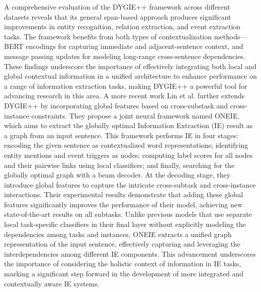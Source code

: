 A comprehensive evaluation of the DYGIE++ framework across different datasets reveals that its general span-based approach produces significant improvements in entity recognition, relation extraction, and event extraction tasks. The framework benefits from both types of contextualization methods—BERT encodings for capturing immediate and adjacent-sentence context, and message passing updates for modeling long-range cross-sentence dependencies. These findings underscore the importance of effectively integrating both local and global contextual information in a unified architecture to enhance performance on a range of information extraction tasks, making DYGIE++ a powerful tool for advancing research in this area.
A more recent work Lin et al.\cite{lin-etal-2020-joint} further extends DYGIE++ by incorporating global features based on cross-substask and cross-instance constraints.  They propose a joint neural framework named ONEIE, which aims to extract the globally optimal Information Extraction (IE) result as a graph from an input sentence. This framework performs IE in four stages: encoding the given sentence as contextualized word representations; identifying entity mentions and event triggers as nodes; computing label scores for all nodes and their pairwise links using local classifiers; and finally, searching for the globally optimal graph with a beam decoder. At the decoding stage, they introduce global features to capture the intricate cross-subtask and cross-instance interactions. Their experimental results demonstrate that adding these global features significantly improves the performance of their model, achieving new state-of-the-art results on all subtasks. Unlike previous models that use separate local task-specific classifiers in their final layer without explicitly modeling the dependencies among tasks and instances, ONEIE extracts a unified graph representation of the input sentence, effectively capturing and leveraging the interdependencies among different IE components. This advancement underscores the importance of considering the holistic context of information in IE tasks, marking a significant step forward in the development of more integrated and contextually aware IE systems.
